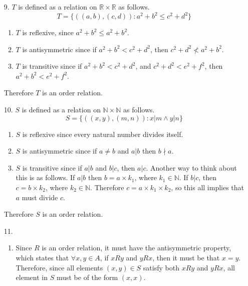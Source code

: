 \documentclass[fleqn]{article}
\begin{document}
\begin{enumerate}
\begin{enumerate}
{
		}
	\end{enumerate}
	
	\item[9.]
	\(T\) is defined as a relation on \(\mathbb{R} \times \mathbb{R}\) as follows.
	\[T = \{((a, b), (c, d)) : a^2 + b^2 \leq c^2 + d^2\}\]
	\begin{enumerate}
		\item %
		\(T\) is reflexive, since \(a^2 + b^2 \leq a^2 + b^2\).

		\item %
		\(T\) is antisymmetric since if \(a^2 + b^2 < c^2 + d^2\), then \(c^2 + d^2 \nless a^2 + b^2\).

		\item %
		\(T\) is transitive since if \(a^2 + b^2 < c^2 + d^2\), and \(c^2 + d^2 < e^2 + f^2\), then \(a^2 + b^2 < e^2 + f^2\).
	\end{enumerate}
	Therefore \(T\) is an order relation.

	\item[10.]
	\(S\) is defined as a relation on \(\mathbb{N} \times \mathbb{N}\) as follows.
	\[S = \{((x, y), (m, n)) : x|m \land y|n\}\]
	\begin{enumerate}
		\item %
		\(S\) is reflexive since every natural number divides itself.

		\item %
		\(S\) is antisymmetric since if \(a \neq b\) and \(a|b\) then \(b \nmid a\).

		\item %
		\(S\) is transitive since if \(a|b\) and \(b|c\), then \(a|c\). Another way to think about this is as follows. If \(a|b\) then \(b = a \times k_1\), where \(k_1 \in \mathbb{N}\). If \(b|c\), then \(c = b \times k_2\), where \(k_2 \in \mathbb{N}\). Therefore \(c = a \times k_1 \times k_2\), so this all implies that \(a\) must divide \(c\).
	\end{enumerate}
	Therefore \(S\) is an order relation.

	\item[11.]
	\begin{enumerate}
		\item %
		Since \(R\) is an order relation, it must have the antisymmetric property, which states that \(\forall x, y \in A\), if \(xRy\) and \(yRx\), then it must be that \(x = y\). Therefore, since all elements \((x, y) \in S\) satisfy both \(xRy\) and \(yRx\), all element in \(S\) must be of the form \((x, x)\).


\end{enumerate}
\end{enumerate}
\end{document}

